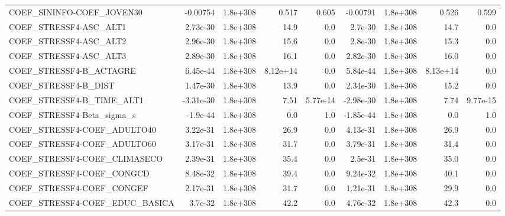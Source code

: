 \begin{tabular}{lrrrrrrrr}
COEF\_SININFO-COEF\_JOVEN30         &    -0.00754 &     1.8e+308 &     0.517 &    0.605 &   -0.00791 &    1.8e+308 &        0.526 &         0.599 \\
COEF\_STRESSF4-ASC\_ALT1            &    2.73e-30 &     1.8e+308 &      14.9 &      0.0 &    2.7e-30 &    1.8e+308 &         14.7 &           0.0 \\
COEF\_STRESSF4-ASC\_ALT2            &    2.96e-30 &     1.8e+308 &      15.6 &      0.0 &    2.8e-30 &    1.8e+308 &         15.3 &           0.0 \\
COEF\_STRESSF4-ASC\_ALT3            &    2.89e-30 &     1.8e+308 &      16.1 &      0.0 &   2.82e-30 &    1.8e+308 &         16.0 &           0.0 \\
COEF\_STRESSF4-B\_ACTAGRE           &    6.45e-44 &     1.8e+308 &  8.12e+14 &      0.0 &   5.84e-44 &    1.8e+308 &     8.13e+14 &           0.0 \\
COEF\_STRESSF4-B\_DIST              &    1.47e-30 &     1.8e+308 &      13.9 &      0.0 &   2.34e-30 &    1.8e+308 &         15.2 &           0.0 \\
COEF\_STRESSF4-B\_TIME\_ALT1         &   -3.31e-30 &     1.8e+308 &      7.51 & 5.77e-14 &  -2.98e-30 &    1.8e+308 &         7.74 &      9.77e-15 \\
COEF\_STRESSF4-Beta\_sigma\_s        &    -1.9e-44 &     1.8e+308 &       0.0 &      1.0 &  -1.85e-44 &    1.8e+308 &          0.0 &           1.0 \\
COEF\_STRESSF4-COEF\_ADULTO40       &    3.22e-31 &     1.8e+308 &      26.9 &      0.0 &   4.13e-31 &    1.8e+308 &         26.9 &           0.0 \\
COEF\_STRESSF4-COEF\_ADULTO60       &    3.17e-31 &     1.8e+308 &      31.7 &      0.0 &   3.79e-31 &    1.8e+308 &         31.4 &           0.0 \\
COEF\_STRESSF4-COEF\_CLIMASECO      &    2.39e-31 &     1.8e+308 &      35.4 &      0.0 &    2.5e-31 &    1.8e+308 &         35.0 &           0.0 \\
COEF\_STRESSF4-COEF\_CONGCD         &    8.48e-32 &     1.8e+308 &      39.4 &      0.0 &   9.24e-32 &    1.8e+308 &         40.1 &           0.0 \\
COEF\_STRESSF4-COEF\_CONGEF         &    2.17e-31 &     1.8e+308 &      31.7 &      0.0 &   1.21e-31 &    1.8e+308 &         29.9 &           0.0 \\
COEF\_STRESSF4-COEF\_EDUC\_BASICA    &     3.7e-32 &     1.8e+308 &      42.2 &      0.0 &   4.76e-32 &    1.8e+308 &         42.3 &           0.0 \\

\end{tabular}
